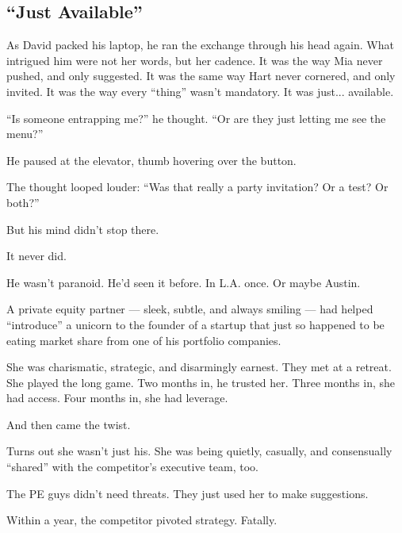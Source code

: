 \subsection{``Just Available''}

As David packed his laptop, he ran the exchange through his head again. What intrigued him were not her words, 
but her cadence. It was the way Mia never pushed, and only suggested. It was the same way Hart never cornered, and only 
invited. It was the way every ``thing'' wasn’t mandatory. It was just... available.

``Is someone entrapping me?'' he thought. ``Or are they just letting me see the menu?''

He paused at the elevator, thumb hovering over the button. 

The thought looped louder: ``Was that really a party invitation? Or a test? Or both?''

But his mind didn’t stop there.

It never did.

He wasn't paranoid. He’d seen it before. In L.A. once. Or maybe Austin.

A private equity partner --- sleek, subtle, and always smiling --- had helped ``introduce'' 
a unicorn to 
the founder of a startup that just so happened to be eating market share from one of his 
portfolio companies.

She was charismatic, strategic, and disarmingly earnest. They met at a retreat. She played the 
long game. Two months in, he trusted her. Three months in, she had access. Four months in, she 
had leverage.

And then came the twist.

Turns out she wasn’t just his. She was being quietly, casually, and consensually
``shared'' with the competitor’s executive team, 
too. 

The PE guys didn’t need threats. They just used her to make suggestions.

Within a year, the competitor pivoted strategy. Fatally.

\medskip

